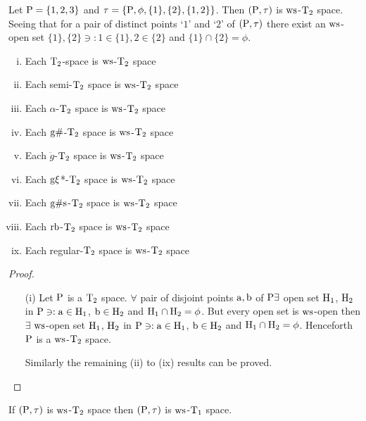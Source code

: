 \begin{exm}\label{exam8.2.15}
Let $\mathrm{P}= \{1,2,3\}$ and $\tau =\{\mathrm{P}, \phi, \{1\},\{2\}, \{1,2\}\}$. Then $(\mathrm{P}, \tau)$ is $\mathrm{ws}$-$\mathrm{T}_{2}$ space. Seeing that for a pair of distinct points `$1$' and `$2$' of $(\mathrm{P}, \tau)$ there exist an $\mathrm{ws}$-open set $\{1\}, \{2\} \ni: 1 \in \{1\}, 2 \in \{2\}$ and $\{1\} \cap \{2\} = \phi$.
\end{exm}

\begin{thm}\label{thm8.2.16}
\begin{enumerate}[(i)]
\item Each $\mathrm{T}_{2}$-space is $\mathrm{ws}$-$\mathrm{T}_{2}$ space
\item Each semi-$\mathrm{T}_{2}$ space is $\mathrm{ws}$-$\mathrm{T}_{2}$ space
\item Each $\alpha$-$\mathrm{T}_{2}$ space is $\mathrm{ws}$-$\mathrm{T}_{2}$ space
\item Each $\mathrm{g}\#$-$\mathrm{T}_{2}$ space is $\mathrm{ws}$-$\mathrm{T}_{2}$ space
\item Each $\ddot{g}$-$\mathrm{T}_{2}$ space is $\mathrm{ws}$-$\mathrm{T}_{2}$ space
\item Each $\mathrm{g}\xi$*-$\mathrm{T}_{2}$ space is $\mathrm{ws}$-$\mathrm{T}_{2}$ space
\item Each $\mathrm{g}\#\mathrm{s}$-$\mathrm{T}_{2}$ space is $\mathrm{ws}$-$\mathrm{T}_{2}$ space
\item Each $\mathrm{rb}$-$\mathrm{T}_{2}$ space is $\mathrm{ws}$-$\mathrm{T}_{2}$ space
\item Each regular-$\mathrm{T}_{2}$ space is $\mathrm{ws}$-$\mathrm{T}_{2}$ space
\end{enumerate}
\end{thm}

\begin{proof}
\begin{itemize}
\item[(i)] Let $\mathrm{P}$ is a $\mathrm{T}_{2}$ space. $\forall$ pair of disjoint points $\mathrm{a}, \mathrm{b}$ of $\mathrm{P} \exists$ open set $\mathrm{H}_{1}$, $\mathrm{H}_{2}$ in $\mathrm{P} \ni: \mathrm{a} \in \mathrm{H}_{1}$, $\mathrm{b} \in \mathrm{H}_{2}$ and $\mathrm{H}_{1} \cap \mathrm{H}_{2} = \phi$. But every open set is $\mathrm{ws}$-open then $\exists$  $\mathrm{ws}$-open set $\mathrm{H}_{1}$, $\mathrm{H}_{2}$ in $\mathrm{P}\ni: \mathrm{a} \in \mathrm{H}_{1}$, $\mathrm{b} \in \mathrm{H}_{2}$ and $\mathrm{H}_{1} \cap \mathrm{H}_{2} = \phi$. Henceforth $\mathrm{P}$ is a $\mathrm{ws}$-$\mathrm{T}_{2}$ space.

Similarly the remaining (ii) to (ix) results can be proved.
\end{itemize}
\end{proof}

\begin{thm}\label{thm8.2.17}
If $(\mathrm{P}, \tau)$ is $\mathrm{ws}$-$\mathrm{T}_{2}$ space then $(\mathrm{P}, \tau)$ is $\mathrm{ws}$-$\mathrm{T}_{1}$ space.
\end{thm}

